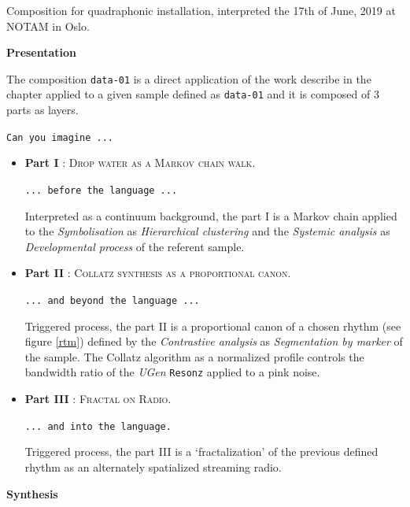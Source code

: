 \bigskip

Composition for quadraphonic installation, interpreted the 17th of June, 2019 at NOTAM in Oslo.

\bigskip

\noindent \textbf{{\large Presentation}}
\hrulefill

\bigskip

The composition \texttt{data-01} is a direct application of the work describe in the chapter \textsl{} applied to a given sample defined as \texttt{data-01} and it is composed of 3 parts as layers.

\bigskip

\texttt{Can you imagine ...} 

\begin{itemize}[leftmargin=0.4in]
\item \textbf{Part I} : \textsc{Drop water as a Markov chain walk}. 

\texttt{... before the language ...} 

Interpreted as a continuum background, the part I is a Markov chain applied to the \textsl{Symbolisation} as \textsl{Hierarchical clustering} and the \textsl{Systemic analysis} as \textsl{Developmental process} of the referent sample.

\item \textbf{Part II} : \textsc{Collatz synthesis as a proportional canon}. 

\texttt{... and beyond the language ...} 

Triggered process, the part II is a proportional canon of a chosen rhythm (see figure \ref{rtm}) defined by the \textsl{Contrastive analysis} as \textsl{Segmentation by marker} of the sample. The Collatz algorithm as a normalized profile controls the bandwidth ratio of the \textsl{UGen} \texttt{Resonz} applied to a pink noise.

\item \textbf{Part III} : \textsc{Fractal on Radio}. 

\texttt{... and into the language.} 

Triggered process, the part III is a `fractalization' of the previous defined rhythm as an alternately spatialized streaming radio.

 \end{itemize}

\smallskip

\noindent \textbf{{\large Synthesis}}
\hrulefill

\bigskip

